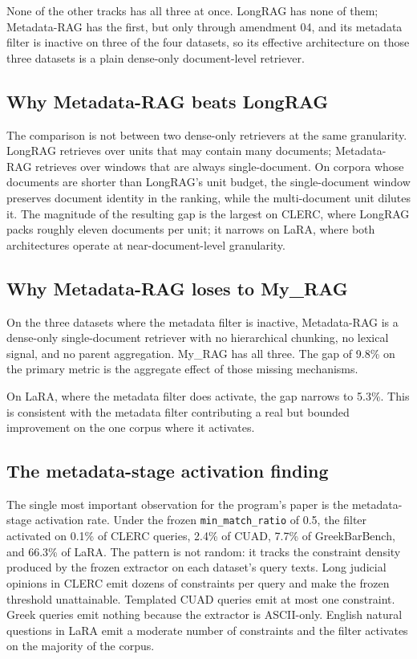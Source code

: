 \documentclass[11pt,a4paper]{article}
\begin{document}
None of the other tracks has all three at once. LongRAG has none of
them; Metadata-RAG has the first, but only through amendment 04, and
its metadata filter is inactive on three of the four datasets, so
its effective architecture on those three datasets is a plain
dense-only document-level retriever.

\subsection{Why Metadata-RAG beats LongRAG}
The comparison is not between two dense-only retrievers at the same
granularity. LongRAG retrieves over units that may contain many
documents; Metadata-RAG retrieves over windows that are always
single-document. On corpora whose documents are shorter than
LongRAG's unit budget, the single-document window preserves
document identity in the ranking, while the multi-document unit
dilutes it. The magnitude of the resulting gap is the largest on
CLERC, where LongRAG packs roughly eleven documents per unit; it
narrows on LaRA, where both architectures operate at
near-document-level granularity.

\subsection{Why Metadata-RAG loses to My\_RAG}
On the three datasets where the metadata filter is inactive,
Metadata-RAG is a dense-only single-document retriever with no
hierarchical chunking, no lexical signal, and no parent aggregation.
My\_RAG has all three. The gap of \num{9.8}\% on the primary metric
is the aggregate effect of those missing mechanisms.

On LaRA, where the metadata filter does activate, the gap narrows to
\num{5.3}\%. This is consistent with the metadata filter contributing
a real but bounded improvement on the one corpus where it activates.

\subsection{The metadata-stage activation finding}
The single most important observation for the program's paper is the
metadata-stage activation rate. Under the frozen
\texttt{min\_match\_ratio} of \num{0.5}, the filter activated on
\num{0.1}\% of CLERC queries, \num{2.4}\% of CUAD, \num{7.7}\% of
GreekBarBench, and \num{66.3}\% of LaRA. The pattern is not random:
it tracks the constraint density produced by the frozen extractor
on each dataset's query texts. Long judicial opinions in CLERC emit
dozens of constraints per query and make the frozen threshold
unattainable. Templated CUAD queries emit at most one constraint.
Greek queries emit nothing because the extractor is ASCII-only.
English natural questions in LaRA emit a moderate number of
constraints and the filter activates on the majority of the corpus.
\end{document}
